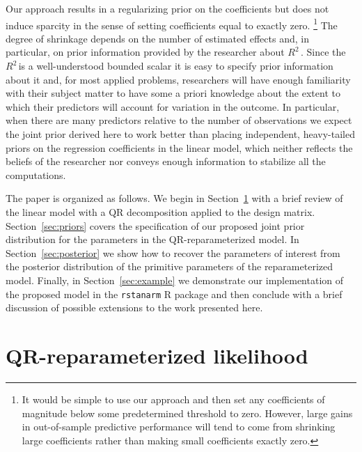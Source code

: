 \documentclass[11pt]{article}
\newcommand{\Rsq}{$R^2\,$}
\begin{document}
Our approach results in a regularizing prior on the coefficients but does not
induce sparcity in the sense of setting coefficients equal to exactly zero.%
\footnote{It would be simple to use our approach and then set any coefficients
of magnitude below some predetermined threshold to zero. However, large gains in
out-of-sample predictive performance will tend to come from shrinking large
coefficients rather than making small coefficients exactly zero.}
The degree of shrinkage depends on the number of estimated effects and, in
particular, on prior information provided by the researcher about \Rsq. Since
the \Rsq is a well-understood bounded scalar it is easy to specify prior
information about it and, for most applied problems, researchers will have
enough familiarity with their subject matter to have some a priori knowledge
about the extent to which their predictors will account for variation in the
outcome. In particular, when there are many predictors relative to the number of
observations we expect the joint prior derived here to work better than placing
independent, heavy-tailed priors on the regression coefficients in the linear
model, which neither reflects the beliefs of the researcher nor conveys enough
information to stabilize all the computations.

The paper is organized as follows. We begin in Section~\ref{sec:likelihood} with
a brief review of the linear model with a QR decomposition applied to the design
matrix. Section~\ref{sec:priors} covers the specification of our proposed joint
prior distribution for the parameters in the QR-reparameterized model. In
Section~\ref{sec:posterior} we show how to recover the parameters of interest
from the posterior distribution of the primitive parameters of the
reparameterized model. Finally, in Section~\ref{sec:example} we demonstrate our
implementation of the proposed model in the {\tt rstanarm} R package and then
conclude with a brief discussion of possible extensions to the work presented
here.


\section{QR-reparameterized likelihood}
\label{sec:likelihood}
\end{document}
